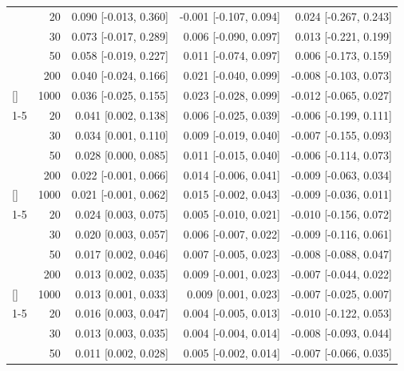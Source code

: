 \documentclass[
  nonatbib,
  authoryear,
  preprint]{elsarticle}
\begin{document}
\begin{longtable}[t]{lrrrr}
\endfoot
\bottomrule
\endlastfoot
 & 20 & 0.090 [-0.013, 0.360] & -0.001 [-0.107, 0.094] & 0.024 [-0.267, 0.243]\\
\nopagebreak
 & 30 & 0.073 [-0.017, 0.289] & 0.006 [-0.090, 0.097] & 0.013 [-0.221, 0.199]\\
\nopagebreak
 & 50 & 0.058 [-0.019, 0.227] & 0.011 [-0.074, 0.097] & 0.006 [-0.173, 0.159]\\
\nopagebreak
 & 200 & 0.040 [-0.024, 0.166] & 0.021 [-0.040, 0.099] & -0.008 [-0.103, 0.073]\\
\nopagebreak
\multirow[t]{-4}{*}[\normalbaselineskip]{\raggedright\arraybackslash 5} & 1000 & 0.036 [-0.025, 0.155] & 0.023 [-0.028, 0.099] & -0.012 [-0.065, 0.027]\\
\cmidrule{1-5}\pagebreak[0]
 & 20 & 0.041 [0.002, 0.138] & 0.006 [-0.025, 0.039] & -0.006 [-0.199, 0.111]\\
\nopagebreak
 & 30 & 0.034 [0.001, 0.110] & 0.009 [-0.019, 0.040] & -0.007 [-0.155, 0.093]\\
\nopagebreak
 & 50 & 0.028 [0.000, 0.085] & 0.011 [-0.015, 0.040] & -0.006 [-0.114, 0.073]\\
\nopagebreak
 & 200 & 0.022 [-0.001, 0.066] & 0.014 [-0.006, 0.041] & -0.009 [-0.063, 0.034]\\
\nopagebreak
\multirow[t]{-4}{*}[\normalbaselineskip]{\raggedright\arraybackslash 10} & 1000 & 0.021 [-0.001, 0.062] & 0.015 [-0.002, 0.043] & -0.009 [-0.036, 0.011]\\
\cmidrule{1-5}\pagebreak[0]
 & 20 & 0.024 [0.003, 0.075] & 0.005 [-0.010, 0.021] & -0.010 [-0.156, 0.072]\\
\nopagebreak
 & 30 & 0.020 [0.003, 0.057] & 0.006 [-0.007, 0.022] & -0.009 [-0.116, 0.061]\\
\nopagebreak
 & 50 & 0.017 [0.002, 0.046] & 0.007 [-0.005, 0.023] & -0.008 [-0.088, 0.047]\\
\nopagebreak
 & 200 & 0.013 [0.002, 0.035] & 0.009 [-0.001, 0.023] & -0.007 [-0.044, 0.022]\\
\nopagebreak
\multirow[t]{-4}{*}[\normalbaselineskip]{\raggedright\arraybackslash 15} & 1000 & 0.013 [0.001, 0.033] & 0.009 [0.001, 0.023] & -0.007 [-0.025, 0.007]\\
\cmidrule{1-5}\pagebreak[0]
 & 20 & 0.016 [0.003, 0.047] & 0.004 [-0.005, 0.013] & -0.010 [-0.122, 0.053]\\
\nopagebreak
 & 30 & 0.013 [0.003, 0.035] & 0.004 [-0.004, 0.014] & -0.008 [-0.093, 0.044]\\
\nopagebreak
 & 50 & 0.011 [0.002, 0.028] & 0.005 [-0.002, 0.014] & -0.007 [-0.066, 0.035]\\

\end{longtable}
\end{document}
